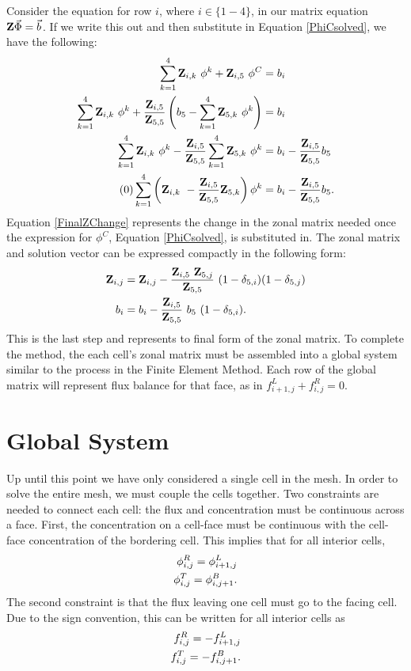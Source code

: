 \documentclass[11pt,letterpaper,oneside,notitlepage]{article}	%
\newcommand{\yestag}{\tag{\theequation}\stepcounter{equation}}	%
\newcommand{\eq}[1]{Equation \eqref{#1}}		%
\newcommand{\pindent}[1]{\hspace{6mm}}  		%
\numberwithin{equation}{section}				%
\begin{document}
Consider the equation for row $i$, where $i\in\{1-4\}$, in our matrix equation ${\bf Z}\vec\Phi=\vec b$.  If we write this out and then substitute in \eq{PhiCsolved}, we have the following:
\begin{align*}
\sum_{k=1}^4 {\bf Z}_{i,k}\ \phi^k + {\bf Z}_{i,5}\ \phi^C &= b_i \\
\sum_{k=1}^4 {\bf Z}_{i,k}\ \phi^k +\frac{{\bf Z}_{i,5}}{{\bf Z}_{5,5}} \left( b_5 - \sum_{k=1}^4 {\bf Z}_{5,k}\ \phi^k \right) &= b_i \\
\sum_{k=1}^4 {\bf Z}_{i,k}\ \phi^k -\frac{{\bf Z}_{i,5}}{{\bf Z}_{5,5}} \sum_{k=1}^4 {\bf Z}_{5,k}\ \phi^k &= b_i -\frac{{\bf Z}_{i,5}}{{\bf Z}_{5,5}}b_5 \\ \yestag
\sum_{k=1}^4 \left({\bf Z}_{i,k}\  -\frac{{\bf Z}_{i,5}}{{\bf Z}_{5,5}} {\bf Z}_{5,k}\right) \phi^k &= b_i -\frac{{\bf Z}_{i,5}}{{\bf Z}_{5,5}}b_5\label{FinalZChange}
.\end{align*}
\eq{FinalZChange} represents the change in the zonal matrix needed once the expression for $\phi^C$, \eq{PhiCsolved}, is substituted in. The zonal matrix and solution vector can be expressed compactly in the following form:
\begin{align}
{\bf Z}_{i,j}&={\bf Z}_{i,j}-\frac{{\bf Z}_{i,5}\ {\bf Z}_{5,j}}{{\bf Z}_{5,5}}\ (1-\delta_{5,i})(1-\delta_{5,j})\\
b_i &= b_i-\frac{{\bf Z}_{i,5}}{{\bf Z}_{5,5}}\ b_5\ (1-\delta_{5,i})
.\end{align}
This is the last step and represents to final form of the zonal matrix.  To complete the method, the each cell's zonal matrix must be assembled into a global system similar to the process in the Finite Element Method. Each row of the global matrix will represent flux balance for that face, as in $f^L_{i+1,j}+f^R_{i,j}=0$.

\section{Global System}%
\label{sec:Global}
\pindent{}Up until this point we have only considered a single cell in the mesh. In order to solve the entire mesh, we must couple the cells together. Two constraints are needed to connect each cell: the flux and concentration must be continuous across a face.  First, the concentration on a cell-face must be continuous with the cell-face concentration of the bordering cell. This implies that for all interior cells, 
\begin{align} 
\phi_{i,j}^R=\phi_{i+1,j}^L \label{ConcCon}\\
\phi_{i,j}^T=\phi_{i,j+1}^B \notag.
 \end{align}
The second constraint is that the flux leaving one cell must go to the facing cell.  Due to the sign convention, this can be written for all interior cells as
\begin{align} 
f_{i,j}^R=-f_{i+1,j}^L \label{FluxCon}\\
f_{i,j}^T=-f_{i,j+1}^B \notag.
 \end{align}
\end{document}
